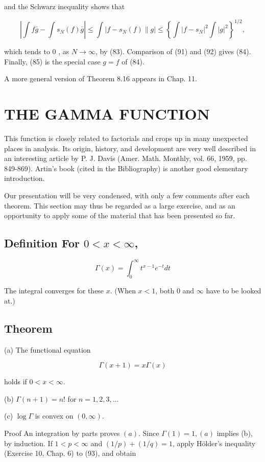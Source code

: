 \documentclass[10pt]{article}
\begin{document}
and the Schwarz inequality shows that

$$
\left|\int f \bar{g}-\int s_{N}(f) \bar{g}\right| \leq \int\left|f-s_{N}(f) \| g\right| \leq\left\{\int\left|f-s_{N}\right|^{2} \int|g|^{2}\right\}^{1 / 2},
$$

which tends to 0 , as $N \rightarrow \infty$, by (83). Comparison of (91) and (92) gives (84). Finally, (85) is the special case $g=f$ of (84).

A more general version of Theorem 8.16 appears in Chap. 11.

\section{THE GAMMA FUNCTION}
This function is closely related to factorials and crops up in many unexpected places in analysis. Its origin, history, and development are very well described in an interesting article by P. J. Davis (Amer. Math. Monthly, vol. 66, 1959, pp. 849-869). Artin's book (cited in the Bibliography) is another good elementary introduction.

Our presentation will be very condensed, with only a few comments after each theorem. This section may thus be regarded as a large exercise, and as an opportunity to apply some of the material that has been presented so far.

\subsection{Definition For $0<x<\infty$,}
$$
\Gamma(x)=\int_{0}^{\infty} t^{x-1} e^{-t} d t
$$

The integral converges for these $x$. (When $x<1$, both 0 and $\infty$ have to be looked at.)

\subsection{Theorem}
(a) The functional equation

$$
\Gamma(x+1)=x \Gamma(x)
$$

holds if $0<x<\infty$.

(b) $\Gamma(n+1)=n !$ for $n=1,2,3, \ldots$

(c) $\log \Gamma$ is convex on $(0, \infty)$.

Proof An integration by parts proves $(a)$. Since $\Gamma(1)=1,(a)$ implies (b), by induction. If $1<p<\infty$ and $(1 / p)+(1 / q)=1$, apply Hölder's inequality (Exercise 10, Chap. 6) to (93), and obtain
\end{document}
